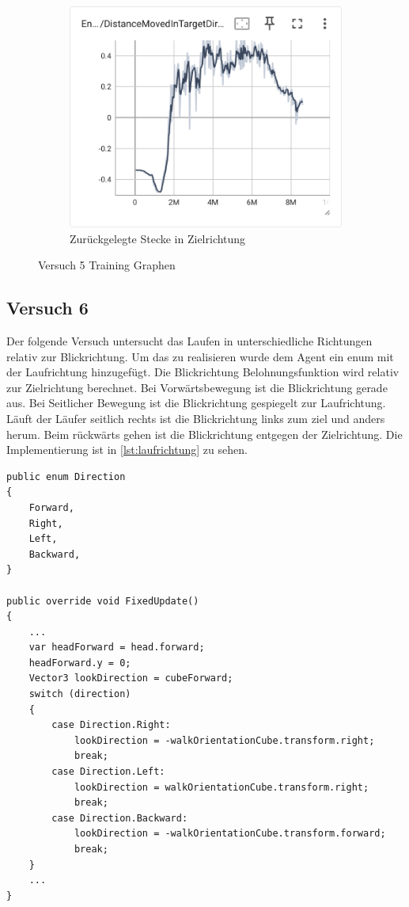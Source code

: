 \begin{figure}[H]
    \begin{subfigure}{.49\textwidth}
      \centering  
      \includegraphics[width=\textwidth]{img/128_move_target_dir}
      \caption{Zurückgelegte Stecke in Zielrichtung}
      \label{fig:128_move_target_dir}
    \end{subfigure}
  \caption{Versuch 5 Training Graphen}
  \label{fig:versuch5_training}
\end{figure}

\subsection{Versuch 6}
Der folgende Versuch untersucht das Laufen in unterschiedliche Richtungen relativ zur Blickrichtung. Um das zu realisieren wurde dem Agent ein enum mit der Laufrichtung hinzugefügt. Die Blickrichtung Belohnungsfunktion wird relativ zur Zielrichtung berechnet. Bei Vorwärtsbewegung ist die Blickrichtung gerade aus. Bei Seitlicher Bewegung ist die Blickrichtung gespiegelt zur Laufrichtung. Läuft der Läufer seitlich rechts ist die Blickrichtung links zum ziel und anders herum. Beim rückwärts gehen ist die Blickrichtung entgegen der Zielrichtung. Die Implementierung ist in \ref{lst:laufrichtung} zu sehen.

\begin{lstlisting}[caption={Laufrichtung Enum, Beobachtung und Belohnung},captionpos=b,label={lst:laufrichtung}]
public enum Direction
{
    Forward,
    Right,
    Left,
    Backward,
}
    
public override void FixedUpdate()
{
    ...
    var headForward = head.forward;
    headForward.y = 0;
    Vector3 lookDirection = cubeForward;
    switch (direction)
    {
        case Direction.Right:
            lookDirection = -walkOrientationCube.transform.right;
            break;
        case Direction.Left:
            lookDirection = walkOrientationCube.transform.right;
            break;
        case Direction.Backward:
            lookDirection = -walkOrientationCube.transform.forward;
            break;
    }
    ...
}
\end{lstlisting}

